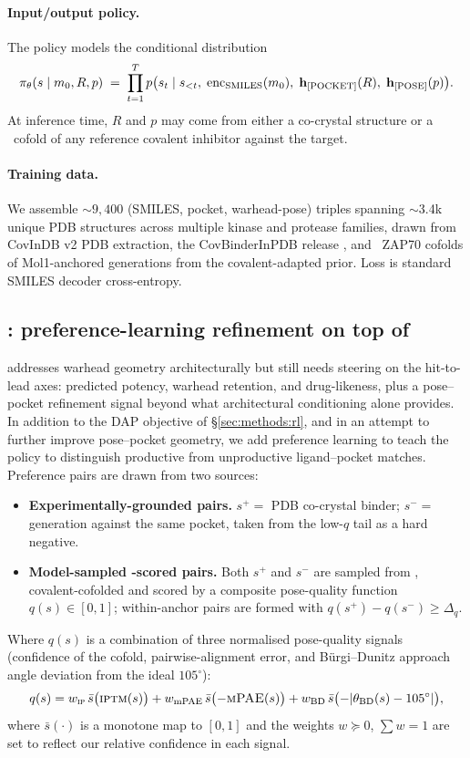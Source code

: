 \paragraph{Input/output policy.}
The \Cvcond{} policy models the conditional distribution
\[
\pi_\theta(s \mid m_0, R, p) \;=\; \prod_{t=1}^{T} p\bigl(s_t \mid s_{<t},\; \mathrm{enc}_{\text{SMILES}}(m_0),\; \mathbf{h}_{[\text{POCKET}]}(R),\; \mathbf{h}_{[\text{POSE}]}(p) \bigr).
\]
At inference time, $R$ and $p$ may come from either a co-crystal structure or a \boltz\ cofold of any reference covalent inhibitor against the target.

\paragraph{Training data.} We assemble $\sim$$9{,}400$ (SMILES, pocket, warhead-pose) triples spanning $\sim$3.4k unique PDB structures across multiple kinase and protease families, drawn from CovInDB v2 PDB extraction, the CovBinderInPDB release \cite{liu2023covbinderinpdb}, and \boltz\ ZAP70 cofolds of Mol1-anchored generations from the covalent-adapted prior. Loss is standard SMILES decoder cross-entropy.

\subsection{\Cvdpo{}: preference-learning refinement on top of \Cvcond{}}\label{sec:methods:covdpo}

\Cvcond{} addresses warhead geometry architecturally but still needs steering on the hit-to-lead axes: predicted potency, warhead retention, and drug-likeness, plus a pose--pocket refinement signal beyond what architectural conditioning alone provides. In addition to the DAP objective of \S\ref{sec:methods:rl}, and in an attempt to further improve pose--pocket geometry, we add preference learning to teach the policy to distinguish productive from unproductive ligand--pocket matches. Preference pairs are drawn from two sources:
\begin{itemize}
  \item \textbf{Experimentally-grounded pairs.} $s^+ = $ PDB co-crystal binder; $s^- = $ \Cvcond{} generation against the same pocket, taken from the low-$q$ tail as a hard negative.
  \item \textbf{Model-sampled \boltz-scored pairs.} Both $s^+$ and $s^-$ are sampled from \Cvcond{}, covalent-cofolded and scored by a composite pose-quality function $q(s) \in [0, 1]$; within-anchor pairs are formed with $q(s^+) - q(s^-) \ge \Delta_q$.
\end{itemize}
Where $q(s)$ is a combination of three normalised pose-quality signals (confidence of the cofold, pairwise-alignment error, and B\"urgi--Dunitz approach angle deviation from the ideal $105^\circ$):
{\footnotesize
\[
q(s) = w_{\textsc{ip}}\,\bar{s}\bigl(\textsc{iptm}(s)\bigr) + w_{\text{mPAE}}\,\bar{s}\bigl(-\textsc{mPAE}(s)\bigr) + w_{\text{BD}}\,\bar{s}\bigl(-\lvert \theta_{\text{BD}}(s)-105^\circ \rvert\bigr),
\]}
where $\bar{s}(\cdot)$ is a monotone map to $[0,1]$ and the weights $w \succeq 0$, $\sum w = 1$ are set to reflect our relative confidence in each signal.


